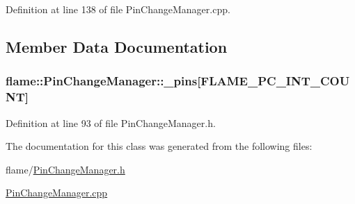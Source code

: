 Definition at line 138 of file Pin\-Change\-Manager.\-cpp.



\subsection{Member Data Documentation}
\hypertarget{classflame_1_1_pin_change_manager_afaa54897b9dbbfe52593512b9fe19cb2}{
\subsubsection[{\-\_\-pins}]{ flame\-::\-Pin\-Change\-Manager\-::\-\_\-pins\mbox{[}{\bf F\-L\-A\-M\-E\-\_\-\-P\-C\-\_\-\-I\-N\-T\-\_\-\-C\-O\-U\-N\-T}\mbox{]}\hspace{0.3cm}{\ttfamily [protected]}}}\label{classflame_1_1_pin_change_manager_afaa54897b9dbbfe52593512b9fe19cb2}


Definition at line 93 of file Pin\-Change\-Manager.\-h.



The documentation for this class was generated from the following files\-:\begin{DoxyCompactItemize}
\item 
flame/\hyperlink{_pin_change_manager_8h}{Pin\-Change\-Manager.\-h}\item 
\hyperlink{_pin_change_manager_8cpp}{Pin\-Change\-Manager.\-cpp}\end{DoxyCompactItemize}
